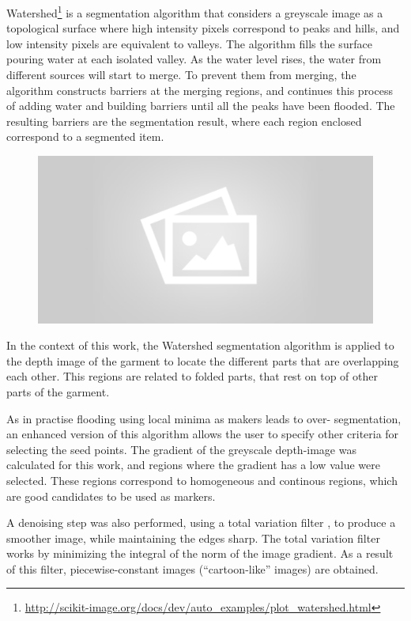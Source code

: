 Watershed\footnote{\url{http://scikit-image.org/docs/dev/auto_examples/plot_watershed.html}} is a segmentation algorithm that considers a greyscale image as a topological surface where high intensity pixels correspond to peaks and hills, and low intensity pixels are equivalent to valleys. The algorithm fills the surface pouring water at each isolated valley. As the water level rises, the water from different sources will start to merge. To prevent them from merging, the algorithm constructs barriers at the merging regions, and continues this process of adding water and building barriers until all the peaks have been flooded. The resulting barriers are the segmentation result, where each region enclosed correspond to a segmented item.

\begin{figure}[thpb]
    \centering
    \includegraphics[width=0.7
    \textwidth]{figures/placeholder2.png}
    \caption{}
    \label{fig:watershed_example}
\end{figure}


In the context of this work, the Watershed segmentation algorithm is applied to the depth image of the garment to locate the different parts that are overlapping each other. This regions are related to folded parts, that rest on top of other parts of the garment. 

As in practise flooding using local minima as makers leads to over- segmentation, an enhanced version of this algorithm allows the user to specify other criteria for selecting the seed points. The gradient of the greyscale depth-image was calculated for this work, and regions where the gradient has a low value were selected. These regions correspond to homogeneous and continous regions, which are good candidates to be used as markers.

 A denoising step was also performed, using a total variation filter , to produce a smoother image, while maintaining the edges sharp. The total variation filter works by minimizing the integral of the norm of the image gradient. As a result of this filter, piecewise-constant images (``cartoon-like'' images) are obtained.

